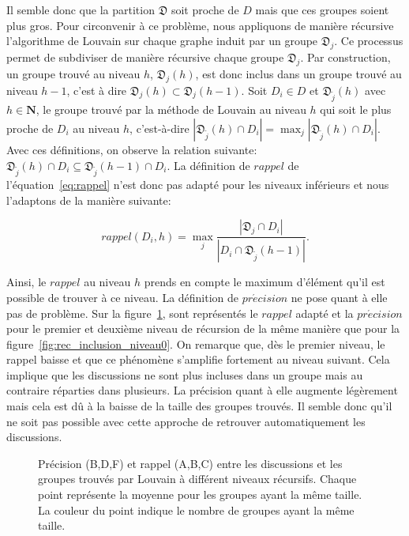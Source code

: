 Il semble donc que la partition $\mathfrak{D}$ soit proche de $D$ mais que ces groupes soient plus gros.
Pour circonvenir à ce problème, nous appliquons de manière récursive l'algorithme de Louvain sur chaque graphe induit par un groupe $\mathfrak{D}_j$.
Ce processus permet de subdiviser de manière récursive chaque groupe $\mathfrak{D}_j$.
Par construction, un groupe trouvé au niveau $h$, $\mathfrak{D}_{j}(h)$, est donc inclus dans un groupe trouvé au niveau $h-1$, c'est à dire $\mathfrak{D}_{j}(h) \subset \mathfrak{D}_{j}(h-1)$. 
Soit $D_i \in D$ et $\mathfrak{D}_{\tilde{j}}(h)$ avec $h \in \mathbf{N}$, le groupe trouvé par la méthode de Louvain au niveau $h$ qui soit le plus proche de $D_i$ au niveau $h$, c'est-à-dire $|\mathfrak{D}_{\tilde{j}}(h)\cap D_i|= \max_{j} |\mathfrak{D}_{\tilde{j}}(h) \cap D_i|$.
Avec ces définitions, on observe la relation suivante: $\mathfrak{D}_{\tilde{j}}(h)\cap D_i \subseteq \mathfrak{D}_{\tilde{j}}(h-1)\cap D_i$.
La définition de $rappel$ de l'équation~\ref{eq:rappel} n'est donc pas adapté pour les niveaux inférieurs et nous l'adaptons de la manière suivante:

\begin{equation}
rappel(D_i,h)= \max_{j} \frac{|\mathfrak{D}_j \cap D_i|}{|D_i \cap \mathfrak{D}_{\tilde{j}}(h-1)|}.
\end{equation}

Ainsi, le $rappel$ au niveau $h$ prends en compte le maximum d'élément qu'il est possible de trouver à ce niveau.
La définition de $pr\acute{e}cision$ ne pose quant à  elle pas de problème.
Sur la figure~\ref{fig:rec_inclusion}, sont représentés le $rappel$ adapté et la $pr\acute{e}cision$ pour le premier et deuxième niveau de récursion de la même manière que pour la figure~\ref{fig:rec_inclusion_niveau0}.
On remarque que, dès le premier niveau, le rappel baisse et que ce phénomène s'amplifie fortement au niveau suivant.
Cela implique que les discussions ne sont plus incluses dans un groupe mais au contraire réparties dans plusieurs.
La précision quant à elle augmente légèrement mais cela est dû à la baisse de la taille des groupes trouvés.
Il semble donc qu'il ne soit pas possible avec cette approche de retrouver automatiquement les discussions.


\begin{figure}
\centering
\hfill
{}
\hfill

\hfill
{}
\hfill

\caption{Précision (B,D,F) et rappel (A,B,C) entre les discussions et les groupes trouvés par Louvain à différent niveaux récursifs. Chaque point représente la moyenne pour les groupes ayant la même taille. La couleur du point indique le nombre de groupes ayant la même taille.}
\label{fig:rec_inclusion}
\end{figure}

